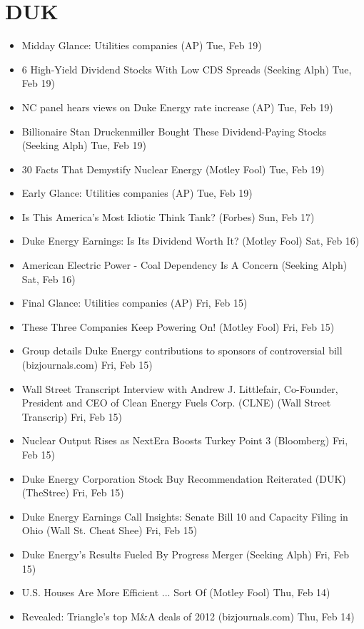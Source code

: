 \documentclass[11pt,asymmetric]{article}
\begin{document}
\section*{DUK}
\begin{itemize}
\item Midday Glance: Utilities companies (AP) Tue, Feb 19)
\item 6 High-Yield Dividend Stocks With Low CDS Spreads (Seeking Alph) Tue, Feb 19)
\item NC panel hears views on Duke Energy rate increase (AP) Tue, Feb 19)
\item Billionaire Stan Druckenmiller Bought These Dividend-Paying Stocks (Seeking Alph) Tue, Feb 19)
\item 30 Facts That Demystify Nuclear Energy (Motley Fool) Tue, Feb 19)
\item Early Glance: Utilities companies (AP) Tue, Feb 19)
\item Is This America's Most Idiotic Think Tank? (Forbes) Sun, Feb 17)
\item Duke Energy Earnings: Is Its Dividend Worth It? (Motley Fool) Sat, Feb 16)
\item American Electric Power - Coal Dependency Is A Concern (Seeking Alph) Sat, Feb 16)
\item Final Glance: Utilities companies (AP) Fri, Feb 15)
\item These Three Companies Keep Powering On! (Motley Fool) Fri, Feb 15)
\item Group details Duke Energy contributions to sponsors of controversial bill (bizjournals.com) Fri, Feb 15)
\item Wall Street Transcript Interview with Andrew J. Littlefair, Co-Founder, President and CEO of Clean Energy Fuels Corp. (CLNE) (Wall Street Transcrip) Fri, Feb 15)
\item Nuclear Output Rises as NextEra Boosts Turkey Point 3 (Bloomberg) Fri, Feb 15)
\item Duke Energy Corporation Stock Buy Recommendation Reiterated (DUK) (TheStree) Fri, Feb 15)
\item Duke Energy Earnings Call Insights: Senate Bill 10 and Capacity Filing in Ohio (Wall St. Cheat Shee) Fri, Feb 15)
\item Duke Energy's Results Fueled By Progress Merger (Seeking Alph) Fri, Feb 15)
\item U.S. Houses Are More Efficient ... Sort Of (Motley Fool) Thu, Feb 14)
\item Revealed: Triangle's top M\&A deals of 2012 (bizjournals.com) Thu, Feb 14)

\end{itemize}
\end{document}
